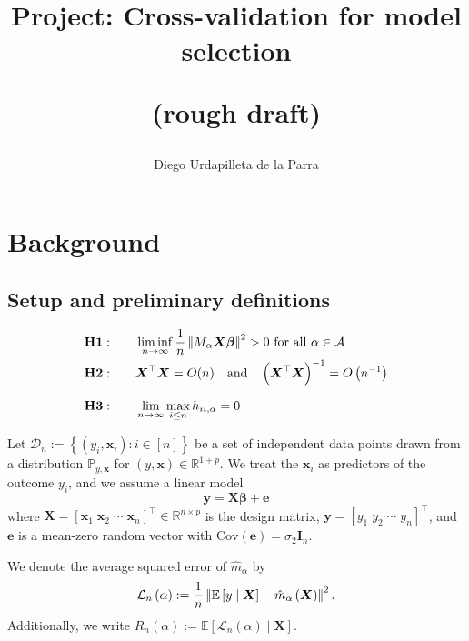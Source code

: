 \documentclass[12pt, letter paper]{article}
\title{Project: Cross-validation for model selection

(rough draft)}
\author{Diego Urdapilleta de la Parra}
\newcommand{\1}{\mathmybb{1}}
\newcommand{\R}{\mathbb{R}}
\newcommand{\0}{\emptyset}
\newcommand{\prob}{\mathbb{P}}
\newcommand{\Ep}[1]{\mathbb{E}\left[ #1 \right]}
\newcommand{\paren}[1]{\left(#1 \right)}
\newcommand{\sqbr}[1]{\left[#1 \right]}
\newcommand{\set}[1]{\left\{ #1 \right\}}
\newcommand{\norm}[1]{\left|\hspace{-1pt}\left|#1 \right|\hspace{-1pt}\right|}
\newcommand{\normsq}[1]{\norm{#1}^{2}}
\newcommand{\data}{\mathcal{D}_{n}}
\newcommand{\Acal}{\mathcal{A}}
\newcommand{\X}{\boldsymbol{X}}
\newcommand{\x}{\boldsymbol{x}}
\newcommand{\y}{\boldsymbol{y}}
\newcommand{\e}{\boldsymbol{e}}
\newcommand{\Cov}[1]{\mathrm{Cov}\paren{#1}}
\newcommand{\bbeta}{\boldsymbol{\beta}}
\newcommand{\Loss}[1]{\mathcal{L}_{n}\paren{#1}}
\begin{document}
%
\maketitle

\section{Background}
\subsection{Setup and preliminary definitions}
\begin{tcolorbox}[title=Assumptions, fonttitle=\bfseries]
    \begin{align*}
        &\mathbf{H1:}\qquad \liminf_{n\to\infty} \frac{1}{n}\normsq{M_{\alpha}\X\bbeta}>0 \text{ for all }\alpha \in\Acal\\
        &\mathbf{H2:} \qquad \X^{\top}\X = O(n)\quad\text{and}\quad\paren{\X^{\top}\X}^{-1}= O\paren{n^{-1}}\\[2.5mm]
        &\mathbf{H3:}\qquad \lim_{n\to\infty}\max_{i\leq n}h_{ii,\alpha} = 0\\
    \end{align*}
\end{tcolorbox}
    

Let \(\data := \set{\paren{y_{i}, \x_{i}}:i\in [n]}\) be a set of independent data points drawn from a distribution \(\prob_{y, \x}\) for \((y, \x)\in\R^{1+p}\). We treat the \(\x_{i}\) as predictors of the outcome \(y_{i}\), and we assume a linear model
\[\y = \X\bbeta + \e\]
where \(\X = {[\x_{1}\;\x_{2}\;\cdots\;\x_{n}]}^{\top}\in\R^{n\times p}\) is the design matrix, \(\y = \sqbr{y_{1}\; y_{2}\;\cdots\; y_{n}}^{\top}\), and \(\e\) is a mean-zero random vector with \(\Cov{\e} = \sigma_{2}\boldsymbol{I}_{n}\).

\begin{definition}
    We denote the average squared error of \(\hat{m}_{\alpha}\) by
    \[\Loss{\alpha}:=\frac{1}{n}\norm{\Ep{y\mid\X} - \hat{m}_{\alpha}\paren{\X}}^{2}.\]
    Additionally, we write
    \(R_{n}(\alpha):= \Ep{\Loss{\alpha}\mid\X}\).
\end{definition}
\end{document}
